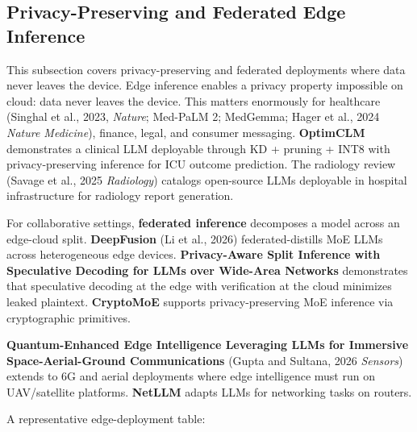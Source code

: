 \documentclass{article}
\begin{document}
\subsection{Privacy-Preserving and Federated Edge Inference}\label{privacy-preserving-and-federated-edge-inference}

This subsection covers privacy-preserving and federated deployments where data never leaves the device. Edge inference enables a privacy property impossible on cloud: data never leaves the device. This matters enormously for healthcare (Singhal et al., 2023, \emph{Nature}; Med-PaLM 2; MedGemma; Hager et al., 2024 \emph{Nature Medicine}), finance, legal, and consumer messaging. \textbf{OptimCLM} \citep{hasan2025optimclmoptimizing} demonstrates a clinical LLM deployable through KD + pruning + INT8 with privacy-preserving inference for ICU outcome prediction. The radiology review (Savage et al., 2025 \emph{Radiology}) catalogs open-source LLMs deployable in hospital infrastructure for radiology report generation.

For collaborative settings, \textbf{federated inference} decomposes a model across an edge-cloud split. \textbf{DeepFusion} (Li et al., 2026) federated-distills MoE LLMs across heterogeneous edge devices. \textbf{Privacy-Aware Split Inference with Speculative Decoding for LLMs over Wide-Area Networks} \citep{cunningham2026privacyawarespliti} demonstrates that speculative decoding at the edge with verification at the cloud minimizes leaked plaintext. \textbf{CryptoMoE} \citep{zhou20252025} supports privacy-preserving MoE inference via cryptographic primitives.

\textbf{Quantum-Enhanced Edge Intelligence Leveraging LLMs for Immersive Space-Aerial-Ground Communications} (Gupta and Sultana, 2026 \emph{Sensors}) extends to 6G and aerial deployments where edge intelligence must run on UAV/satellite platforms. \textbf{NetLLM} \citep{wu20242024} adapts LLMs for networking tasks on routers.

A representative edge-deployment table:
\end{document}
